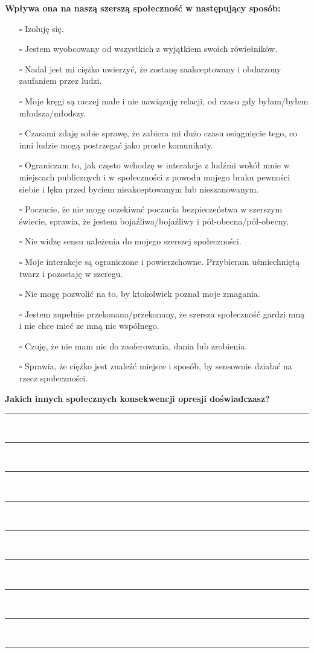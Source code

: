 \newpage
\noindent
\textbf{\large{Wpływa ona na naszą szerszą społeczność w następujący sposób:}}
\begin{multicols}{2}
\begin{itemize}
\item[$\square$]{Izoluję się.}
\item[$\square$]{Jestem wyobcowany od wszystkich z wyjątkiem swoich rówieśników.}
\item[$\square$]{Nadal jest mi ciężko uwierzyć, że zostanę zaakceptowany i obdarzony zaufaniem przez ludzi.}
\item[$\square$]{Moje kręgi są raczej małe i nie nawiązuję relacji, od czasu gdy byłam/byłem młodsza/młodszy.}
\item[$\square$]{Czasami zdaję sobie sprawę, że zabiera mi dużo czasu osiągnięcie tego, co inni ludzie mogą postrzegać jako proste komunikaty.}
\item[$\square$]{Ograniczam to, jak często wchodzę w interakcje z ludźmi wokół mnie w miejscach publicznych i w społeczności z powodu mojego braku pewności siebie i lęku przed byciem nieakceptowanym lub nieszanowanym.}
\item[$\square$]{Poczucie, że nie mogę oczekiwać poczucia bezpieczeństwa w szerszym świecie, sprawia, że jestem bojaźliwa/bojaźliwy i pół-obecna/pół-obecny.}
\item[$\square$]{Nie widzę sensu należenia do mojego szerszej społeczności.}
\item[$\square$]{Moje interakcje są ograniczone i powierzchowne. Przybieram uśmiechniętą twarz i pozostaję w szeregu.}
\item[$\square$]{Nie mogę pozwolić na to, by ktokolwiek poznał moje zmagania.}
\item[$\square$]{Jestem zupełnie przekonana/przekonany, że szersza społeczność gardzi mną i nie chce mieć ze mną nic wspólnego.}
\item[$\square$]{Czuję, że nie mam nic do zaoferowania, dania lub zrobienia.}
\item[$\square$]{Sprawia, że ciężko jest znaleźć miejsce i sposób, by sensownie działać na rzecz społeczności.}
\end{itemize}
\end{multicols}

\noindent
\textcolor{ProcessBlue}{\textbf{\Large{Jakich innych społecznych konsekwencji opresji doświadczasz?}}}\\
\noindent\rule{\textwidth}{1pt}\\
\noindent\rule{\textwidth}{1pt}\\
\noindent\rule{\textwidth}{1pt}\\
\noindent\rule{\textwidth}{1pt}\\
\noindent\rule{\textwidth}{1pt}\\
\noindent\rule{\textwidth}{1pt}\\
\noindent\rule{\textwidth}{1pt}\\
\noindent\rule{\textwidth}{1pt}\\
\noindent\rule{\textwidth}{1pt}\\\\


